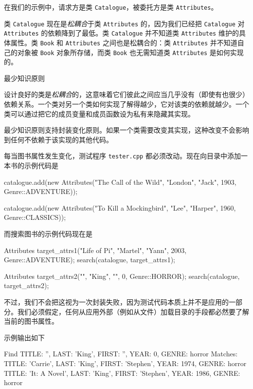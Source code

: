 在我们的示例中，请求方是类 \texttt{Catalogue}，被委托方是类 \texttt{Attributes}。

类 \texttt{Catalogue} 现在是\emph{松耦合}于类 \texttt{Attributes} 的，因为我们已经把 \texttt{Catalogue} 对 \texttt{Attributes} 的依赖降到了最低。类 \texttt{Catalogue} 并不知道类 \texttt{Attributes} 维护的具体属性。类 \texttt{Book} 和 \texttt{Attributes} 之间也是松耦合的：类 \texttt{Attributes} 并不知道自己的对象被 \texttt{Book} 对象所存储，而类 \texttt{Book} 也无需知道类 \texttt{Attributes} 是如何实现的。

\begin{mySidebar}{最少知识原则}

设计良好的类是\emph{松耦合}的，这意味着它们彼此之间应当几乎没有（即使有也很少）依赖关系。一个类对另一个类如何实现了解得越少，它对该类的依赖就越少。一个类可以通过把它的成员变量和成员函数设为私有来隐藏其实现。

最少知识原则支持封装变化原则。如果一个类需要改变其实现，这种改变不会影响到任何不依赖于该实现的其他代码。
\end{mySidebar}

每当图书属性发生变化，测试程序 \texttt{tester.\allowbreak{}cpp} 都必须改动。现在向目录中添加一本书的示例代码是

\begin{codebox}
    catalogue.add(new Attributes("The Call of the Wild", 
                                 "London", "Jack",
                                 1903, Genre::ADVENTURE));

    catalogue.add(new Attributes("To Kill a Mockingbird", 
                                 "Lee", "Harper",
                                 1960, Genre::CLASSICS));
\end{codebox}

而搜索图书的示例代码现在是

\begin{codebox}
    Attributes target_attrs1("Life of Pi", "Martel", "Yann",
                             2003, Genre::ADVENTURE);
    search(catalogue, target_attrs1);

    Attributes target_attrs2("", "King", "", 0, Genre::HORROR);
    search(catalogue, target_attrs2);
\end{codebox}

不过，我们不会把这视为一次封装失败，因为测试代码本质上并不是应用的一部分。我们必须假定，任何从应用外部（例如从文件）加载目录的手段都必然要了解当前的图书属性。

示例输出如下

\begin{codebox}
Find {TITLE: '', LAST: 'King', FIRST: '', YEAR: 0, GENRE: horror}
Matches:
  {TITLE: 'Carrie', LAST: 'King', FIRST: 'Stephen', YEAR: 1974, GENRE: horror}
  {TITLE: 'It: A Novel', LAST: 'King', FIRST: 'Stephen', YEAR: 1986, GENRE: horror}
\end{codebox}

